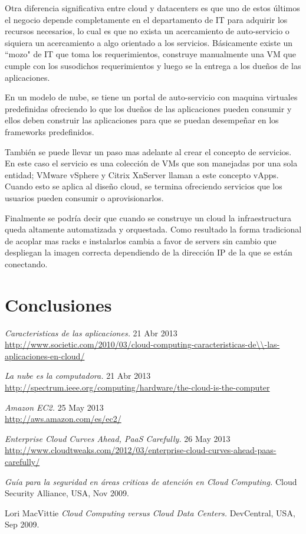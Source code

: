 \documentclass[12pt,a4paper]{article}
\begin{document}
Otra diferencia significativa entre cloud y datacenters es que uno de estos últimos el negocio 
depende completamente en el departamento de IT para adquirir los recursos necesarios, lo cual es que
no exista un acercamiento de auto-servicio o siquiera un acercamiento a algo orientado a los 
servicios. Básicamente existe un ``mozo" de IT que toma los requerimientos, construye manualmente una
VM que cumple con los susodichos requerimientos y luego se la entrega a los dueños de las 
aplicaciones.

En un modelo de nube, se tiene un portal de auto-servicio con maquina virtuales predefinidas 
ofreciendo lo que los dueños de las aplicaciones pueden consumir y ellos deben construir las 
aplicaciones para que se puedan desempeñar en los frameworks predefinidos. 

También se puede llevar un paso mas adelante al crear el concepto de servicios. En este caso el 
servicio es una colección de VMs que son manejadas por una sola entidad; VMware vSphere y Citrix 
XnServer llaman a este concepto vApps. Cuando esto se aplica al diseño cloud, se termina ofreciendo
servicios que los usuarios pueden consumir o aprovisionarlos.

Finalmente se podría decir que cuando se construye un cloud la infraestructura queda altamente 
automatizada y orquestada. Como resultado la forma tradicional de acoplar mas racks e instalarlos 
cambia a favor de servers sin cambio que despliegan la imagen correcta dependiendo de la dirección IP
de la que se están conectando.

\section{Conclusiones}

\newpage

\begin{thebibliography}{1}

\emph{Caracteristicas de las aplicaciones. }
 21 Abr 2013\\
\url{http://www.societic.com/2010/03/cloud-computing-caracteristicas-de\\-las-aplicaciones-en-cloud/}
 
\emph{La nube es la computadora. } 
 21 Abr 2013\\
 \url{http://spectrum.ieee.org/computing/hardware/the-cloud-is-the-computer}

\emph{Amazon EC2. }
 25 May 2013\\
 \url{http://aws.amazon.com/es/ec2/} 

\emph{Enterprise Cloud Curves Ahead, PaaS Carefully. }
 26 May 2013\\
 \url{http://www.cloudtweaks.com/2012/03/enterprise-cloud-curves-ahead-paas-carefully/}

\emph{Guía para la seguridad en áreas criticas de atención en Cloud Computing. } Cloud Security 
Alliance,
 USA, Nov 2009.

	Lori MacVittie	
	\emph{Cloud Computing versus Cloud Data Centers.} DevCentral,
	USA,
	Sep 2009. 	

\end{thebibliography}
\end{document}
